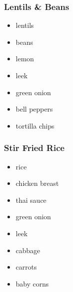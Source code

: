 \documentclass[11pt, a4paper]{article}
\begin{document}
\subsubsection{Lentils \& Beans}
\vspace{1pc}
\begin{itemize}
\item lentils
\item beans
\item lemon
\item leek
\item green onion
\item bell peppers
\item tortilla chips
\end{itemize}




\subsubsection{Stir Fried Rice}
\vspace{1pc}
\begin{itemize}
\item rice
\item chicken breast
\item thai sauce
\item green onion
\item leek
\item cabbage
\item carrots
\item baby corns
\end{itemize}
\end{document}
